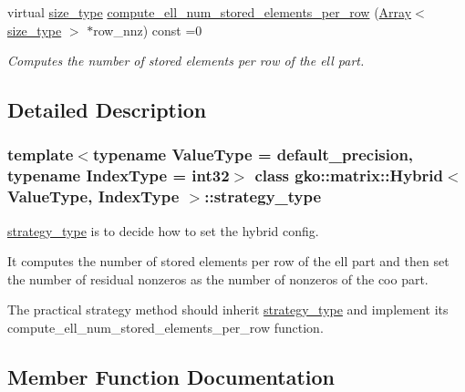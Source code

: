 \begin{DoxyCompactItemize}
virtual \hyperlink{namespacegko_a6e5c95df0ae4e47aab2f604a22d98ee7}{size\+\_\+type} \hyperlink{classgko_1_1matrix_1_1Hybrid_1_1strategy__type_a0a0cd4024f27c7d0f286f35fc0a6de60}{compute\+\_\+ell\+\_\+num\+\_\+stored\+\_\+elements\+\_\+per\+\_\+row} (\hyperlink{classgko_1_1Array}{Array}$<$ \hyperlink{namespacegko_a6e5c95df0ae4e47aab2f604a22d98ee7}{size\+\_\+type} $>$ $\ast$row\+\_\+nnz) const =0
\begin{DoxyCompactList}\small\item\em Computes the number of stored elements per row of the ell part. \end{DoxyCompactList}\end{DoxyCompactItemize}


\subsection{Detailed Description}
\subsubsection*{template$<$typename Value\+Type = default\+\_\+precision, typename Index\+Type = int32$>$\newline
class gko\+::matrix\+::\+Hybrid$<$ Value\+Type, Index\+Type $>$\+::strategy\+\_\+type}

\hyperlink{classgko_1_1matrix_1_1Hybrid_1_1strategy__type}{strategy\+\_\+type} is to decide how to set the hybrid config. 

It computes the number of stored elements per row of the ell part and then set the number of residual nonzeros as the number of nonzeros of the coo part.

The practical strategy method should inherit \hyperlink{classgko_1_1matrix_1_1Hybrid_1_1strategy__type}{strategy\+\_\+type} and implement its {\ttfamily compute\+\_\+ell\+\_\+num\+\_\+stored\+\_\+elements\+\_\+per\+\_\+row} function. 

\subsection{Member Function Documentation}
\mbox{\label{classgko_1_1matrix_1_1Hybrid_1_1strategy__type_a0a0cd4024f27c7d0f286f35fc0a6de60}} 
